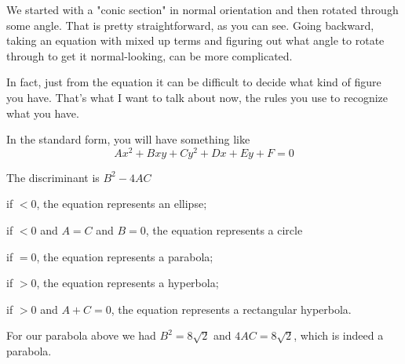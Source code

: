 \documentclass[11pt, oneside]{article}   	%
\begin{document}
We started with a "conic section" in normal orientation and then rotated through some angle.  That is pretty straightforward, as you can see.  Going backward, taking an equation with mixed up terms and figuring out what angle to rotate through to get it normal-looking, can be more complicated.

In fact, just from the equation it can be difficult to decide what kind of figure you have.  That's what I want to talk about now, the rules you use to recognize what you have.

In the standard form, you will have something like
\[ Ax^2 + Bxy + Cy^2 + Dx + Ey + F = 0 \]

\noindent The discriminant is $B^2 - 4AC$
\vspace{2 mm}

\noindent if $< 0$, the equation represents an ellipse;
\vspace{1 mm}

\noindent if $< 0$ and $A = C$ and $B = 0$, the equation represents a circle
\vspace{1 mm}

\noindent if $= 0$, the equation represents a parabola;
\vspace{1 mm}

\noindent if $> 0$, the equation represents a hyperbola;
\vspace{1 mm}

\noindent if $> 0$ and $A + C = 0$, the equation represents a rectangular hyperbola.
\vspace{2 mm}

For our parabola above we had $B^2 = 8\sqrt{2}$ and $4AC = 8\sqrt{2}$, which is indeed a parabola.
\end{document}
